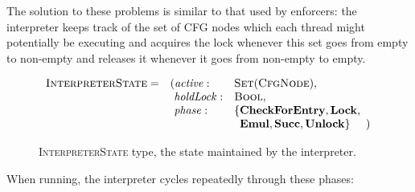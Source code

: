 The solution to these problems is similar to that used by enforcers:
the interpreter keeps track of the set of CFG nodes which each thread
might potentially be executing and acquires the lock whenever this set
goes from empty to non-empty and releases it whenever it goes from
non-empty to empty.

\begin{figure}
  \begin{displaymath}
    \begin{array}{llll}
      \textsc{InterpreterState} = & (\mathit{active}: &\textsc{Set}(\textsc{CfgNode}), &\\
      & \,\,\mathit{holdLock}: &\textsc{Bool},\\
      & \,\,\mathit{phase}: & \{\mathbf{CheckForEntry}, \mathbf{Lock}, \\
      &                     & \,\,\,\mathbf{Emul}, \mathbf{Succ}, \mathbf{Unlock}\} &\!\!\!)\\
    \end{array}
  \end{displaymath}
  \caption{\textsc{InterpreterState} type, the state maintained by the
    interpreter.}
  \label{fig:fix_bugs:interpreter_state}
\end{figure}

When running, the interpreter cycles repeatedly through these phases:

